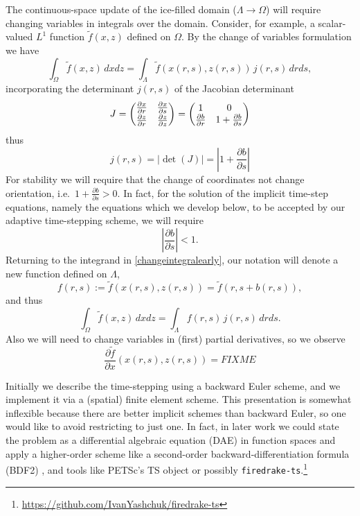 \documentclass[letterpaper,final,12pt,reqno]{amsart}
\begin{document}
The continuous-space update of the ice-filled domain ($\Lambda\to\Omega$) will require changing variables in integrals over the domain.  Consider, for example, a scalar-valued $L^1$ function $\tilde f(x,z)$ defined on $\Omega$.  By the change of variables formulation we have
\begin{equation}
\int_\Omega \tilde f(x,z)\,dx dz = \int_\Lambda \tilde f(x(r,s),z(r,s)) \, j(r,s)\,dr ds, \label{changeintegralearly}
\end{equation}
incorporating the determinant $j(r,s)$ of the Jacobian determinant
\begin{equation}
J = \begin{pmatrix} \frac{\partial x}{\partial r} & \frac{\partial x}{\partial s} \\ {\large\strut} \frac{\partial z}{\partial r} & \frac{\partial z}{\partial z} \end{pmatrix} = \begin{pmatrix} 1 & 0 \\ \frac{\partial b}{\partial r} & 1+\frac{\partial b}{\partial s} \end{pmatrix} \label{jacchange}
\end{equation}
thus
\begin{equation}
j(r,s) = |\det(J)| = \left|1+\frac{\partial b}{\partial s}\right|  \label{jacchangedet}
\end{equation}
For stability we will require that the change of coordinates not change orientation, i.e.~$1+\frac{\partial b}{\partial s}>0$.  In fact, for the solution of the implicit time-step equations, namely the equations which we develop below, to be accepted by our adaptive time-stepping scheme, we will require
\begin{equation}
\left|\frac{\partial b}{\partial s}\right| < 1.\label{stableremap}
\end{equation}
Returning to the integrand in \eqref{changeintegralearly}, our notation will denote a new function defined on $\Lambda$,
    $$f(r,s) := \tilde f(x(r,s),z(r,s)) = \tilde f(r,s+b(r,s)),$$
and thus
\begin{equation}
\int_\Omega \tilde f(x,z)\,dx dz = \int_\Lambda f(r,s) \, j(r,s)\,dr ds. \label{changeintegral}
\end{equation}
Also we will need to change variables in (first) partial derivatives, so we observe
    $$\frac{\partial \tilde f}{\partial x}(x(r,s),z(r,s)) = FIXME$$

Initially we describe the time-stepping using a backward Euler scheme, and we implement it via a (spatial) finite element scheme.  This presentation is somewhat inflexible because there are better implicit schemes than backward Euler, so one would like to avoid restricting to just one.  In fact, in later work we could state the problem as a differential algebraic equation (DAE) in function spaces and apply a higher-order scheme like a second-order backward-differentiation formula (BDF2) \cite{AscherPetzold1998}, and tools like PETSc's TS object \cite{Balayetal2020,BuelerBook} or possibly \texttt{firedrake-ts}.\footnote{\url{https://github.com/IvanYashchuk/firedrake-ts}}
\end{document}
